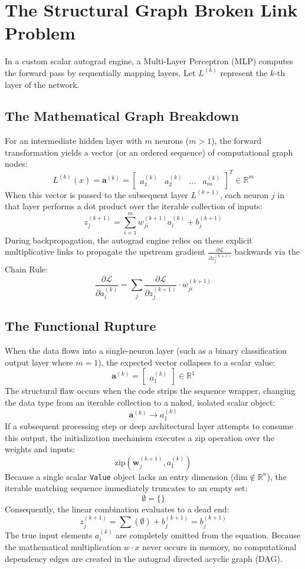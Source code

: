 \documentclass{article}
\begin{document}
\section*{The Structural Graph Broken Link Problem}

In a custom scalar autograd engine, a Multi-Layer Perceptron (MLP) computes the forward pass by sequentially mapping layers. Let $L^{(k)}$ represent the $k$-th layer of the network.

\subsection*{The Mathematical Graph Breakdown}

For an intermediate hidden layer with $m$ neurons ($m > 1$), the forward transformation yields a vector (or an ordered sequence) of computational graph nodes:
\[
L^{(k)}(x) = \mathbf{a}^{(k)} = \begin{bmatrix} a_1^{(k)} & a_2^{(k)} & \dots & a_m^{(k)} \end{bmatrix}^T \in \mathbb{R}^m
\]
When this vector is passed to the subsequent layer $L^{(k+1)}$, each neuron $j$ in that layer performs a dot product over the iterable collection of inputs:
\[
z_j^{(k+1)} = \sum_{i=1}^{m} w_{ji}^{(k+1)} a_i^{(k)} + b_j^{(k+1)}
\]
During backpropagation, the autograd engine relies on these explicit multiplicative links to propagate the upstream gradient $\frac{\partial \mathcal{L}}{\partial z_j^{(k+1)}}$ backwards via the Chain Rule:
\[
\frac{\partial \mathcal{L}}{\partial a_i^{(k)}} = \sum_{j} \frac{\partial \mathcal{L}}{\partial z_j^{(k+1)}} \cdot w_{ji}^{(k+1)}
\]

\subsection*{The Functional Rupture}

When the data flows into a single-neuron layer (such as a binary classification output layer where $m = 1$), the expected vector collapses to a scalar value:
\[
\mathbf{a}^{(k)} = \begin{bmatrix} a_1^{(k)} \end{bmatrix} \in \mathbb{R}^1
\]
The structural flaw occurs when the code strips the sequence wrapper, changing the data type from an iterable collection to a naked, isolated scalar object:
\[
\mathbf{a}^{(k)} \longrightarrow a_1^{(k)}
\]
If a subsequent processing step or deep architectural layer attempts to consume this output, the initialization mechanism executes a zip operation over the weights and inputs:
\[
\text{zip}\left(\mathbf{w}_j^{(k+1)}, a_1^{(k)}\right)
\]
Because a single scalar \texttt{Value} object lacks an entry dimension ($\text{dim} \notin \mathbb{R}^n$), the iterable matching sequence immediately truncates to an empty set:
\[
\emptyset = \{\}
\]
Consequently, the linear combination evaluates to a dead end:
\[
z_j^{(k+1)} = \sum(\emptyset) + b_j^{(k+1)} = b_j^{(k+1)}
\]
The true input elements $a_i^{(k)}$ are completely omitted from the equation. Because the mathematical multiplication $w \cdot x$ never occurs in memory, no computational dependency edges are created in the autograd directed acyclic graph (DAG).
\end{document}
